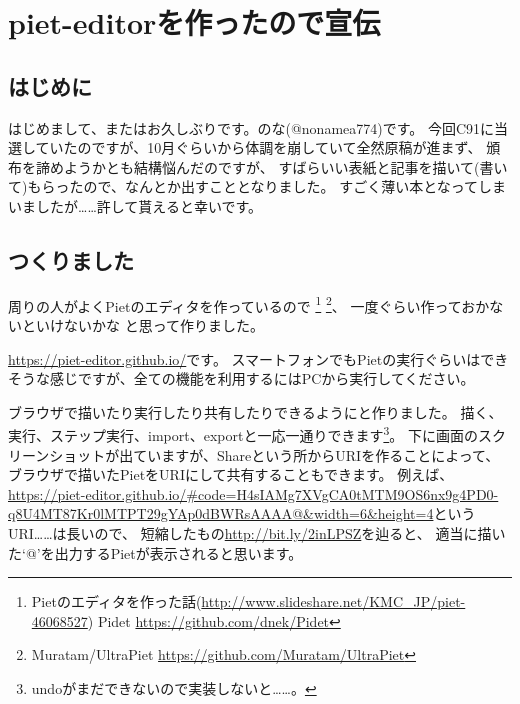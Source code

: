 \chapter[piet-editorを作ったので宣伝]{piet-editorを作ったので宣伝}

\section{はじめに}

はじめまして、またはお久しぶりです。のな(@nonamea774)です。
今回C91に当選していたのですが、10月ぐらいから体調を崩していて全然原稿が進まず、
頒布を諦めようかとも結構悩んだのですが、
すばらいい表紙と記事を描いて(書いて)もらったので、なんとか出すこととなりました。
すごく薄い本となってしまいましたが……許して貰えると幸いです。

\section{つくりました}

周りの人がよくPietのエディタを作っているので
\footnote{Pietのエディタを作った話(\url{http://www.slideshare.net/KMC_JP/piet-46068527}) Pidet \url{https://github.com/dnek/Pidet}}
\footnote{Muratam/UltraPiet \url{https://github.com/Muratam/UltraPiet}}、
一度ぐらい作っておかないといけないかな と思って作りました。

\url{https://piet-editor.github.io/}です。
スマートフォンでもPietの実行ぐらいはできそうな感じですが、全ての機能を利用するにはPCから実行してください。

ブラウザで描いたり実行したり共有したりできるようにと作りました。
描く、実行、ステップ実行、import、exportと一応一通りできます\footnote{undoがまだできないので実装しないと……。}。
下に画面のスクリーンショットが出ていますが、Shareという所からURIを作ることによって、
ブラウザで描いたPietをURIにして共有することもできます。
例えば、\href{https://piet-editor.github.io/#code=H4sIAMg7XVgCA0tMTM9OS6nx9g4PD0-q8U4MT87Kr0lMTPT29gYAp0dBWRsAAAA@&width=6&height=4}{https://piet-editor.github.io/\#code=H4sIAMg7XVgCA0tMTM9OS6nx9g4PD0-q8U4MT87Kr0lMTPT29gYAp0dBWRsAAAA@\&width=6\&height=4}というURI……は長いので、
短縮したもの\url{http://bit.ly/2inLPSZ}を辿ると、
適当に描いた`@'を出力するPietが表示されると思います。

